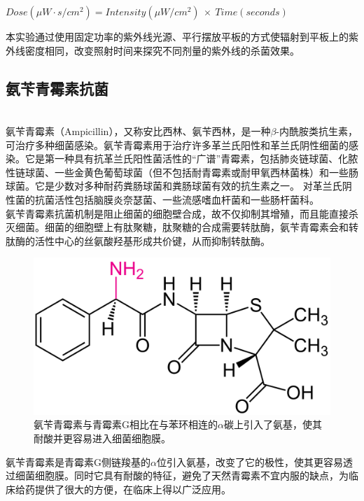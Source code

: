 \documentclass[UTF8]{ctexart}
\begin{document}
    \begin{center}
        $Dose (\mu W·s/cm^{2}) = Intensity (\mu W/cm^{2}) \ × \ Time (seconds)$
    \end{center}

    \indent 本实验通过使用固定功率的紫外线光源、平行摆放平板的方式使辐射到平板上的紫外线密度相同，改变照射时间来探究不同剂量的紫外线的杀菌效果。
    

    \subsection{氨苄青霉素抗菌}
    \
    \\


    \indent  氨苄青霉素（Ampicillin），又称安比西林、氨苄西林，是一种$\beta$-内酰胺类抗生素，可治疗多种细菌感染。氨苄青霉素用于治疗许多革兰氏阳性和革兰氏阴性细菌的感染。它是第一种具有抗革兰氏阳性菌活性的“广谱”青霉素，包括肺炎链球菌、化脓性链球菌、一些金黄色葡萄球菌（但不包括耐青霉素或耐甲氧西林菌株）和一些肠球菌。它是少数对多种耐药粪肠球菌和粪肠球菌有效的抗生素之一。 对革兰氏阴性菌的抗菌活性包括脑膜炎奈瑟菌、一些流感嗜血杆菌和一些肠杆菌科。
    \\ \indent 氨苄青霉素抗菌机制是阻止细菌的细胞壁合成，故不仅抑制其增殖，而且能直接杀灭细菌。细菌的细胞壁上有肽聚糖，肽聚糖的合成需要转肽酶，氨苄青霉素会和转肽酶的活性中心的丝氨酸羟基形成共价键，从而抑制转肽酶。
    
    \begin{figure} %
        \begin{center}
            \includegraphics[scale=0.05]{Ampicillin_with_amine_highlighted.png}
            \caption{氨苄青霉素与青霉素G相比在与苯环相连的$\alpha$碳上引入了氨基，使其耐酸并更容易进入细菌细胞膜。}
            \label{fig:label}
        \end{center}
    \end{figure}
    \indent 氨苄青霉素是青霉素G侧链羧基的$\alpha$位引入氨基，改变了它的极性，使其更容易透过细菌细胞膜。同时它具有耐酸的特征，避免了天然青霉素不宜内服的缺点，为临床给药提供了很大的方便，在临床上得以广泛应用。
    
\end{document}
